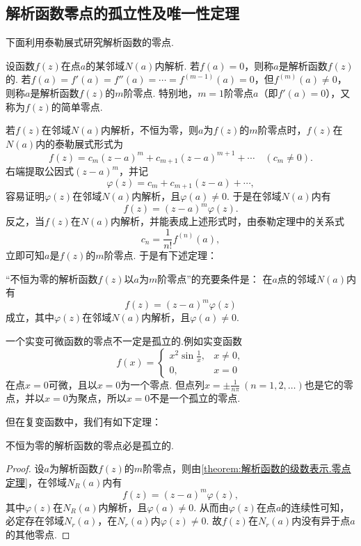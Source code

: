 \subsection{解析函数零点的孤立性及唯一性定理}
下面利用泰勒展式研究解析函数的零点.
\begin{definition}\label{definition:解析函数的级数表示.零点}
设函数\(f(z)\)在点\(a\)的某邻域\(N(a)\)内解析.
若\(f(a)=0\)，则称\(a\)是解析函数\(f(z)\)的.
若\(f(a)=f'(a)=f''(a)=\dotsb=f^{(m-1)}(a)=0\)，但\(f^{(m)}(a)\neq0\)，则称\(a\)是解析函数\(f(z)\)的\(m\)阶零点.
特别地，\(m=1\)阶零点\(a\)（即\(f'(a)=0\)），又称为\(f(z)\)的简单零点.
\end{definition}

若\(f(z)\)在邻域\(N(a)\)内解析，不恒为零，则\(a\)为\(f(z)\)的\(m\)阶零点时，\(f(z)\)在\(N(a)\)内的泰勒展式形式为\[
f(z) = c_m (z-a)^m + c_{m+1} (z-a)^{m+1} + \dotsb \quad(c_m\neq0).
\]右端提取公因式\((z-a)^m\)，并记\[
\varphi(z) = c_m + c_{m+1} (z-a) + \dotsb,
\]容易证明\(\varphi(z)\)在邻域\(N(a)\)内解析，且\(\varphi(a)\neq0\).
于是在邻域\(N(a)\)内有\[
f(z) = (z-a)^m \varphi(z).
\]反之，当\(f(z)\)在\(N(a)\)内解析，并能表成上述形式时，由泰勒定理中的关系式\[
c_n = \frac{1}{n!} f^{(n)}(a),
\]立即可知\(a\)是\(f(z)\)的\(m\)阶零点.
于是有下述定理：
\begin{theorem}\label{theorem:解析函数的级数表示.零点定理}
“不恒为零的解析函数\(f(z)\)以\(a\)为\(m\)阶零点”的充要条件是：
在\(a\)点的邻域\(N(a)\)内有\[
f(z) = (z-a)^m \varphi(z)
\]成立，其中\(\varphi(z)\)在邻域\(N(a)\)内解析，且\(\varphi(a)\neq0\).
\end{theorem}

一个实变可微函数的零点不一定是孤立的.例如实变函数\[
f(x) = \left\{ \begin{array}{cl}
x^2 \sin\frac{1}{x}, & x\neq0, \\
0, & x=0
\end{array} \right.
\]在点\(x=0\)可微，且以\(x=0\)为一个零点.
但点列\(x = \pm\frac{1}{n\pi}\ (n=1,2,\dotsc)\)也是它的零点，并以\(x = 0\)为聚点，所以\(x = 0\)不是一个孤立的零点.

但在复变函数中，我们有如下定理：
\begin{theorem}\label{theorem:解析函数的级数表示.解析函数的零点的孤立性}
不恒为零的解析函数的零点必是孤立的.
\begin{proof}
设\(a\)为解析函数\(f(z)\)的\(m\)阶零点，则由\cref{theorem:解析函数的级数表示.零点定理}，在邻域\(N_R(a)\)内有\[
f(z) = (z-a)^m \varphi(z),
\]其中\(\varphi(z)\)在\(N_R(a)\)内解析，且\(\varphi(a)\neq0\).
从而由\(\varphi(z)\)在点\(a\)的连续性可知，必定存在邻域\(N_r(a)\)，在\(N_r(a)\)内\(\varphi(z)\neq0\).
故\(f(z)\)在\(N_r(a)\)内没有异于点\(a\)的其他零点.
\end{proof}
\end{theorem}

